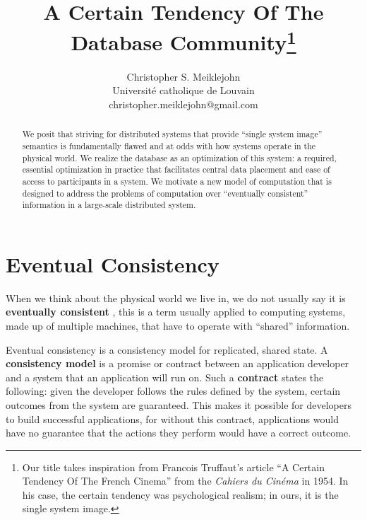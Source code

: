 \documentclass[english]{article}
\begin{document}
\title{A Certain Tendency Of The Database Community\footnote{Our title takes inspiration from Francois Truffaut's article ``A Certain Tendency Of The French Cinema'' from the \textit{Cahiers du Cin\'ema} in 1954.  In his case, the certain tendency was psychological realism; in ours, it is the single system image.}}
\author{Christopher S. Meiklejohn \\ Universit\'e catholique de Louvain \\ christopher.meiklejohn@gmail.com}
\maketitle

\begin{abstract}
We posit that striving for distributed systems that provide ``single system image'' semantics is fundamentally flawed and at odds with how systems operate in the physical world.  We realize the database as an optimization of this system: a required, essential optimization in practice that facilitates central data placement and ease of access to participants in a system.  We motivate a new model of computation that is designed to address the problems of computation over ``eventually consistent'' information in a large-scale distributed system.
\end{abstract}

\section{Eventual Consistency}

When we think about the physical world we live in, we do not usually say it is \textbf{eventually consistent} \cite{vogels2009eventually}, this is a term usually applied to computing systems, made up of multiple machines, that have to operate with ``shared'' information.

Eventual consistency is a consistency model for replicated, shared state.  A \textbf{consistency model} is a promise or contract between an application developer and a system that an application will run on.  Such a \textbf{contract} states the following: given the developer follows the rules defined by the system, certain outcomes from the system are guaranteed.  This makes it possible for developers to build successful applications, for without this contract, applications would have no guarantee that the actions they perform would have a correct outcome.
\end{document}
